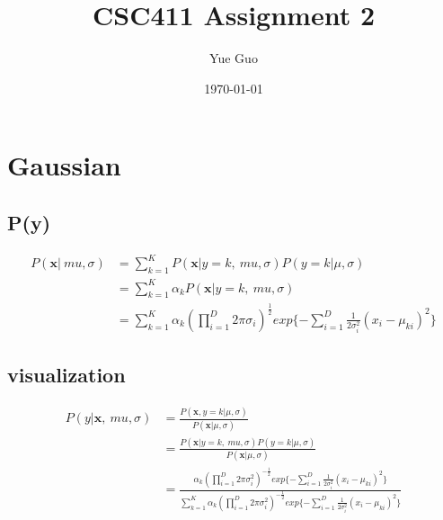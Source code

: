 \documentclass[letterpaper, 12]{article}
\date{\today}
\title{CSC411 Assignment 2}
\author{Yue Guo}
\begin{document}
\maketitle


\section{Gaussian}

\subsection{P(y)}

\begin{equation*}
\begin{split}
P( \bm{x} | \ mu ,  \sigma) &= \sum_{k = 1}^{K}  P( \bm{x} | y = k, \ mu ,  \sigma) P(y = k | \mu, \sigma) \\
&=  \sum_{k = 1}^{K} \alpha_{k} P( \bm{x} | y = k, \ mu ,  \sigma) \\
&= \sum_{k = 1}^{K} \alpha_{k} (\prod_{i=1}^{D} 2\pi \sigma_{i})^{\frac{1}{2}} exp\{{- \sum_{i=1}^{D}} \frac{1}{2 \sigma_{i} ^2} (x_{i} - \mu_{ki})^2 \} 
\end{split}
\end{equation*}
 



\subsection{visualization}

\begin{equation*}
\begin{split}
P(y | \bm{x} , \ mu ,  \sigma) &= \frac{P( \bm{x}, y = k | \mu ,  \sigma)}{P( \bm{x} |  \mu ,  \sigma)}
\\
&= \frac{P( \bm{x} | y = k, \ mu ,  \sigma) P(y = k | \mu ,  \sigma)}{P( \bm{x} |  \mu ,  \sigma)}
\\
&=\frac{ \alpha_{k} (\prod_{i=1}^{D} 2\pi \sigma_{i} ^{2})^{-\frac{1}{2}}  exp\{{- \sum_{i=1}^{D}} \frac{1}
{2 \sigma_{i} ^2} (x_{i} - \mu_{ki})^2 \}  }{\sum_{k=1}^{K} \alpha_{k} (\prod_{i=1}^{D} 2\pi \sigma_{i} ^{2})^{-\frac{1}{2}}  exp\{{- \sum_{i=1}^{D}} \frac{1}
{2 \sigma_{i} ^2} (x_{i} - \mu_{ki})^2 \}} \\
\end{split}
\end{equation*}
\end{document}
